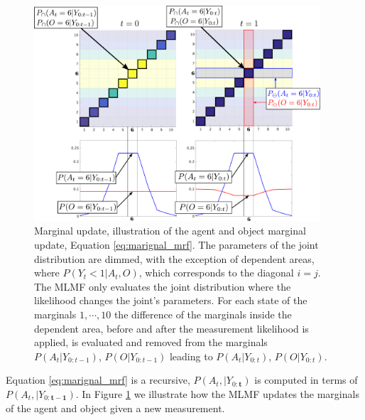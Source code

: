 \begin{figure}
\centering
\includegraphics[width=0.95\textwidth]{./ch5-MLMF/Figures/explenation/marginal_cal_example.pdf}
\caption{Marginal update, illustration of the agent and object marginal update, Equation \ref{eq:marignal_mrf}. The parameters of the joint 
distribution are dimmed, with the exception of dependent areas, where $P(Y_t<1|A_t,O)$, which corresponds to the diagonal $i=j$. The MLMF only
evaluates the joint distribution where the likelihood changes the joint's parameters. For each state of the marginals $1,\cdots,10$ the difference 
of the marginals inside the dependent area, before and after the measurement likelihood is applied, is evaluated and removed from the marginals 
$P(A_t|Y_{0:t-1})$, $P(O|Y_{0:t-1})$ leading to $P(A_t|Y_{0:t})$, $P(O|Y_{0:t})$. }
\label{fig:ch5:marginal_update}
\end{figure}

Equation \ref{eq:marignal_mrf} is a recursive, $P(A_t,|Y_{0:\mathbf{t}})$ is computed in terms of  $P(A_t,|Y_{0:\mathbf{t-1}})$.
In Figure \ref{fig:ch5:marginal_update} we illustrate how the MLMF updates the marginals of the agent and object given a new measurement.


